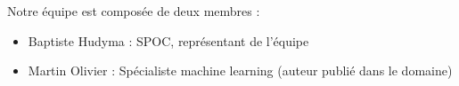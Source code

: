 Notre équipe est composée de deux membres :
\begin {itemize}
\item Baptiste Hudyma : SPOC, représentant de l'équipe 
\item Martin Olivier : Spécialiste machine learning (auteur publié dans le domaine)
\end {itemize}
